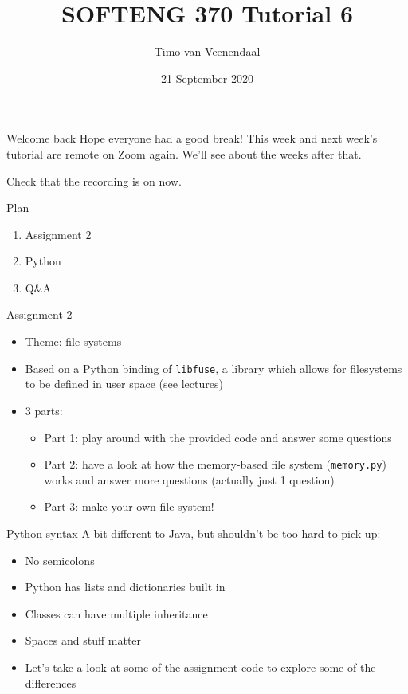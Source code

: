 \documentclass[notes]{beamer}
\title{SOFTENG 370 Tutorial 6}
\author{Timo van Veenendaal}
\date{21 September 2020}
\begin{document}
\maketitle

\begin{frame}{Welcome back}
    Hope everyone had a good break! This week and next week's tutorial are remote on Zoom again. We'll see about the weeks after that.

    Check that the recording is on now.
\end{frame}
\begin{frame}{Plan}
    \begin{enumerate}
        \item Assignment 2
        \item Python
        \item Q\&A
    \end{enumerate}
\end{frame}
\begin{frame}{Assignment 2}
    \begin{itemize}
        \item Theme: file systems
        \item Based on a Python binding of \texttt{libfuse}, a library which allows for filesystems to be defined in user space (see lectures)
        \item 3 parts:
            \begin{itemize}
                \item Part 1: play around with the provided code and answer some questions
                \item Part 2: have a look at how the memory-based file system (\texttt{memory.py}) works and answer more questions (actually just 1 question)
                \item Part 3: make your own file system!
            \end{itemize}
    \end{itemize}
\end{frame}
\begin{frame}{Python syntax}
    A bit different to Java, but shouldn't be too hard to pick up:
    \begin{itemize}
        \item No semicolons
        \item Python has lists and dictionaries built in
        \item Classes can have multiple inheritance
        \item Spaces and stuff matter
        \item Let's take a look at some of the assignment code to explore some of the differences
    \end{itemize}
\end{frame}
\end{document}
